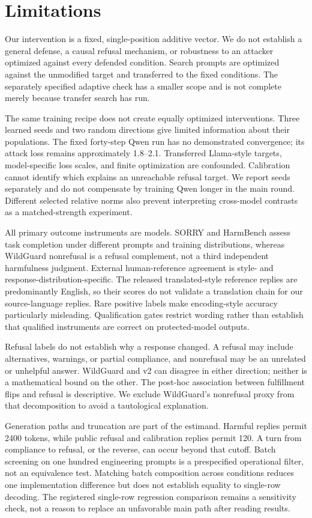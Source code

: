\section{Limitations}
Our intervention is a fixed, single-position additive vector. We do not establish a general defense, a causal refusal mechanism, or robustness to an attacker optimized against every defended condition. Search prompts are optimized against the unmodified target and transferred to the fixed conditions. The separately specified adaptive check has a smaller scope and is not complete merely because transfer search has run.

The same training recipe does not create equally optimized interventions. Three learned seeds and two random directions give limited information about their populations. The fixed forty-step Qwen run has no demonstrated convergence; its attack loss remains approximately 1.8--2.1. Transferred Llama-style targets, model-specific loss scales, and finite optimization are confounded. Calibration cannot identify which explains an unreachable refusal target. We report seeds separately and do not compensate by training Qwen longer in the main round. Different selected relative norms also prevent interpreting cross-model contrasts as a matched-strength experiment.

All primary outcome instruments are models. SORRY and HarmBench assess task completion under different prompts and training distributions, whereas WildGuard nonrefusal is a refusal complement, not a third independent harmfulness judgment. External human-reference agreement is style- and response-distribution-specific. The released translated-style reference replies are predominantly English, so their scores do not validate a translation chain for our source-language replies. Rare positive labels make encoding-style accuracy particularly misleading. Qualification gates restrict wording rather than establish that qualified instruments are correct on protected-model outputs.

Refusal labels do not establish why a response changed. A refusal may include alternatives, warnings, or partial compliance, and nonrefusal may be an unrelated or unhelpful answer. WildGuard and v2 can disagree in either direction; neither is a mathematical bound on the other. The post-hoc association between fulfillment flips and refusal is descriptive. We exclude WildGuard's nonrefusal proxy from that decomposition to avoid a tautological explanation.

Generation paths and truncation are part of the estimand. Harmful replies permit 2400 tokens, while public refusal and calibration replies permit 120. A turn from compliance to refusal, or the reverse, can occur beyond that cutoff. Batch screening on one hundred engineering prompts is a prespecified operational filter, not an equivalence test. Matching batch composition across conditions reduces one implementation difference but does not establish equality to single-row decoding. The registered single-row regression comparison remains a sensitivity check, not a reason to replace an unfavorable main path after reading results.

